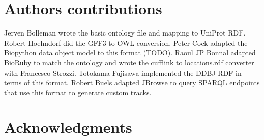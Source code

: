 \documentclass[10pt]{bmc_article}
\newenvironment{bmcformat}{\begin{raggedright}\baselineskip20pt\sloppy\setboolean{publ}{false}}{\end{raggedright}\baselineskip20pt\sloppy}
\begin{document}
\begin{bmcformat}
\section*{Authors contributions}

Jerven Bolleman wrote the basic ontology file and mapping to UniProt RDF.
Robert Hoehndorf did the GFF3 to OWL conversion.
Peter Cock adapted the Biopython data object model to this format (TODO).
Raoul JP Bonnal adapted BioRuby to match the ontology and wrote the cufflink to locations.rdf converter with Francesco Strozzi.
Totokama Fujisawa implemented the DDBJ RDF in terms of this format.
Robert Buels adapted JBrowse to query SPARQL endpoints that use this format to generate custom tracks. 

\section*{Acknowledgments}



\newpage
{
   }     %
  
\end{bmcformat}
\end{document}
